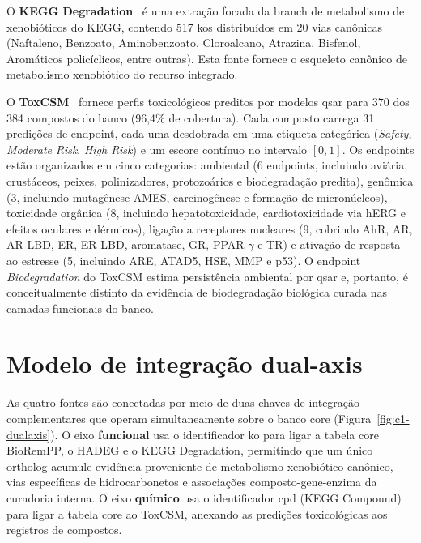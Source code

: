 O \textbf{KEGG Degradation}~\citep{kanehisa2022kegg} é uma extração focada da branch de metabolismo de xenobióticos do KEGG, contendo 517 \glspl{ko} distribuídos em 20 vias canônicas (Naftaleno, Benzoato, Aminobenzoato, Cloroalcano, Atrazina, Bisfenol, Aromáticos policíclicos, entre outras). Esta fonte fornece o esqueleto canônico de metabolismo xenobiótico do recurso integrado.

O \textbf{ToxCSM}~\citep{desa2022toxCSM} fornece perfis toxicológicos preditos por modelos \gls{qsar} para 370 dos 384 compostos do banco (96,4\% de cobertura). Cada composto carrega 31 predições de endpoint, cada uma desdobrada em uma etiqueta categórica (\textit{Safety}, \textit{Moderate Risk}, \textit{High Risk}) e um escore contínuo no intervalo $[0, 1]$. Os endpoints estão organizados em cinco categorias: ambiental (6 endpoints, incluindo aviária, crustáceos, peixes, polinizadores, protozoários e biodegradação predita), genômica (3, incluindo mutagênese AMES, carcinogênese e formação de micronúcleos), toxicidade orgânica (8, incluindo hepatotoxicidade, cardiotoxicidade via hERG e efeitos oculares e dérmicos), ligação a receptores nucleares (9, cobrindo AhR, AR, AR-LBD, ER, ER-LBD, aromatase, GR, PPAR-$\gamma$ e TR) e ativação de resposta ao estresse (5, incluindo ARE, ATAD5, HSE, MMP e p53). O endpoint \textit{Biodegradation} do ToxCSM estima persistência ambiental por \gls{qsar} e, portanto, é conceitualmente distinto da evidência de biodegradação biológica curada nas camadas funcionais do banco.

\section{Modelo de integração dual-axis}
\label{sec:c1-dualaxis}

As quatro fontes são conectadas por meio de duas chaves de integração complementares que operam simultaneamente sobre o banco core (Figura~\ref{fig:c1-dualaxis}). O eixo \textbf{funcional} usa o identificador \gls{ko} para ligar a tabela core BioRemPP, o HADEG e o KEGG Degradation, permitindo que um único ortholog acumule evidência proveniente de metabolismo xenobiótico canônico, vias específicas de hidrocarbonetos e associações composto-gene-enzima da curadoria interna. O eixo \textbf{químico} usa o identificador \gls{cpd} (KEGG Compound) para ligar a tabela core ao ToxCSM, anexando as predições toxicológicas aos registros de compostos.

